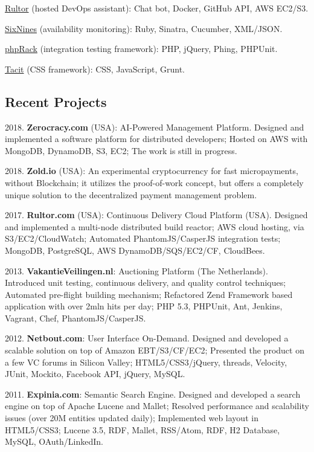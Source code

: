 \documentclass[12pt]{article}
\begin{document}
\href{http://www.rultor.com}{Rultor} (hosted DevOps assistant):
Chat bot, Docker, GitHub API, AWS EC2/S3.

\href{http://www.sixnines.io}{SixNines} (availability monitoring):
Ruby, Sinatra, Cucumber, XML/JSON.

\href{http://www.phprack.com}{phpRack} (integration testing framework):
PHP, jQuery, Phing, PHPUnit.

\href{https://github.com/yegor256/tacit}{Tacit} (CSS framework):
CSS, JavaScript, Grunt.

\subsection*{Recent Projects}

2018. \textbf{Zerocracy.com} (USA): AI-Powered Management Platform.
Designed and implemented a software platform for distributed developers;
Hosted on AWS with MongoDB, DynamoDB, S3, EC2;
The work is still in progress.

2018. \textbf{Zold.io} (USA): An experimental cryptocurrency for
fast micropayments, without Blockchain; it utilizes the proof-of-work
concept, but offers a completely unique solution to the decentralized
payment management problem.

2017. \textbf{Rultor.com} (USA): Continuous Delivery Cloud Platform (USA).
Designed and implemented a multi-node distributed build reactor;
AWS cloud hosting, via S3/EC2/CloudWatch;
Automated PhantomJS/CasperJS integration tests;
MongoDB, PostgreSQL, AWS DynamoDB/SQS/EC2/CF, CloudBees.

2013. \textbf{VakantieVeilingen.nl}: Auctioning Platform (The Netherlands).
Introduced unit testing, continuous delivery, and quality control techniques;
Automated pre-flight building mechanism;
Refactored Zend Framework based application with over 2mln hits per day;
PHP 5.3, PHPUnit, Ant, Jenkins, Vagrant, Chef, PhantomJS/CasperJS.

2012. \textbf{Netbout.com}: User Interface On-Demand.
Designed and developed a scalable solution on top of Amazon EBT/S3/CF/EC2;
Presented the product on a few VC forums in Silicon Valley;
HTML5/CSS3/jQuery, threads, Velocity, JUnit, Mockito, Facebook API, jQuery, MySQL.

2011. \textbf{Expinia.com}: Semantic Search Engine.
Designed and developed a search engine on top of Apache Lucene and Mallet;
Resolved performance and scalability issues (over 20M entities updated daily);
Implemented web layout in HTML5/CSS3;
Lucene 3.5, RDF, Mallet, RSS/Atom, RDF, H2 Database, MySQL, OAuth/LinkedIn.
\end{document}
